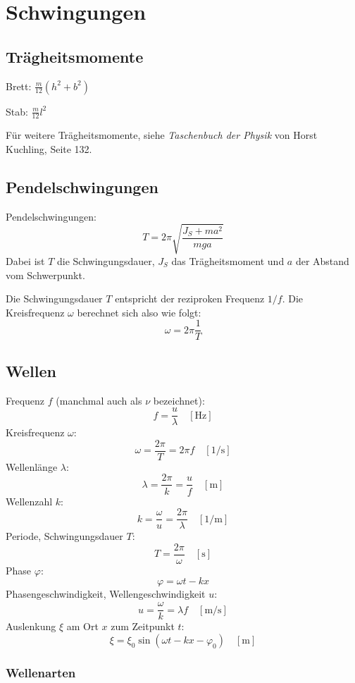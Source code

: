 \section{Schwingungen}

\subsection{Trägheitsmomente}

Brett: $\displaystyle\frac{m}{12} \left(h^2 + b^2\right)$

Stab: $\displaystyle\frac{m}{12} l^2$

Für weitere Trägheitsmomente, siehe \textit{Taschenbuch der Physik} von Horst
Kuchling, Seite 132.

\subsection{Pendelschwingungen}

Pendelschwingungen:
\[
	T = 2 \pi \sqrt{\frac{J_S + ma^2}{mga}}	
\]
Dabei ist $T$ die Schwingungsdauer, $J_S$ das Trägheitsmoment und $a$ der
Abstand vom Schwerpunkt.

Die Schwingungsdauer $T$ entspricht der reziproken Frequenz $1/f$. Die
Kreisfrequenz $\omega$ berechnet sich also wie folgt:
\[
	\omega = 2\pi\frac{1}{T}
\]

\subsection{Wellen}



Frequenz $f$ (manchmal auch als $\nu$ bezeichnet):
\[
	f = \frac{u}{\lambda}
	\quad \left[ \textrm{Hz} \right]
\]
Kreisfrequenz $\omega$:
\[
	\omega = \frac{2 \pi}{T} = 2 \pi f
	\quad \left[ 1/\textrm{s} \right]
\]
Wellenlänge $\lambda$:
\[
	\lambda = \frac{2 \pi}{k} = \frac{u}{f}
	\quad \left[ \textrm{m} \right]
\]
Wellenzahl $k$:
\[
	k = \frac{\omega}{u} = \frac{2 \pi}{\lambda}
	\quad \left[ 1/\textrm{m} \right]
\]
Periode, Schwingungsdauer $T$:
\[
	T = \frac{2 \pi}{\omega}
	\quad \left[ \textrm{s} \right]
\]
Phase $\varphi$:
\[
	\varphi = \omega t - k x
\]
Phasengeschwindigkeit, Wellengeschwindigkeit $u$:
\[
	u = \frac{\omega}{k} = \lambda f
	\quad \left[ \textrm{m} / \textrm{s} \right]
\]
Auslenkung $\xi$ am Ort $x$ zum Zeitpunkt $t$:
\[
	\xi = \xi_0 \sin (\omega t - k x - \varphi_0)
	\quad \left[ \textrm{m} \right]
\]

\subsubsection{Wellenarten}

